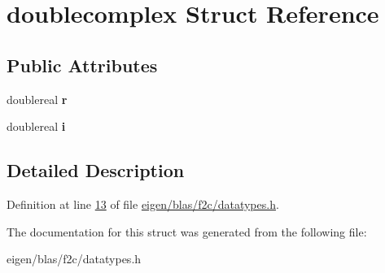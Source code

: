 \hypertarget{structdoublecomplex}{}\section{doublecomplex Struct Reference}
\label{structdoublecomplex}
\subsection*{Public Attributes}
\begin{DoxyCompactItemize}
\item 
\mbox{\label{structdoublecomplex_aa21d9095ea8af6f0530961e14e25d060}} 
doublereal {\bfseries r}
\item 
\mbox{\label{structdoublecomplex_a29ac0f1fc7a96e2344ef1464a80e2877}} 
doublereal {\bfseries i}
\end{DoxyCompactItemize}


\subsection{Detailed Description}


Definition at line \hyperlink{eigen_2blas_2f2c_2datatypes_8h_source_l00013}{13} of file \hyperlink{eigen_2blas_2f2c_2datatypes_8h_source}{eigen/blas/f2c/datatypes.\+h}.



The documentation for this struct was generated from the following file\+:\begin{DoxyCompactItemize}
\item 
eigen/blas/f2c/datatypes.\+h\end{DoxyCompactItemize}

